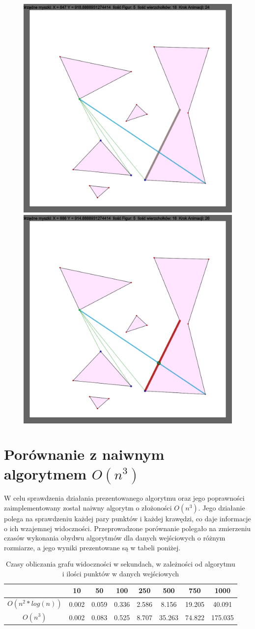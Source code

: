 \documentclass{article}
\begin{document}
\begin{figure}[p]
    \includegraphics[width=.32\textwidth]{ww12.png}\hfill
    \includegraphics[width=.32\textwidth]{ww13.png}
    
\end{figure}




\section{\texorpdfstring{Porównanie z naiwnym algorytmem $O(n^3)$}{}} 

\qquad W celu sprawdzenia działania prezentowanego algorytmu oraz jego poprawności zaimplementowany został naiwny algorytm o złożoności $O(n^3)$. Jego działanie polega na sprawdzeniu każdej pary punktów i każdej krawędzi, co daje informacje o ich wzajemnej widoczności. Przeprowadzone porównanie polegało na zmierzeniu czasów wykonania obydwu algorytmów dla danych wejściowych o różnym rozmiarze, a jego wyniki prezentowane są w tabeli poniżej.

\begin{table}[h]
\caption{Czasy obliczania grafu widoczności w sekundach, w zależności od algorytmu i ilości punktów w danych wejściowych}
\centering
\begin{tabular}{cccccccc}
                      & 10    & 50    & 100   & 250   & 500    & 750    & 1000    \\ \hline
$O(n^2*log(n))$                & 0.002 & 0.059 & 0.336 & 2.586 & 8.156  & 19.205 & 40.091  \\ \hline
$O(n^3)$             & 0.002 & 0.083 & 0.525 & 8.707 & 35.263 & 74.822 & 175.035
\end{tabular}
\end{table}
\end{document}
